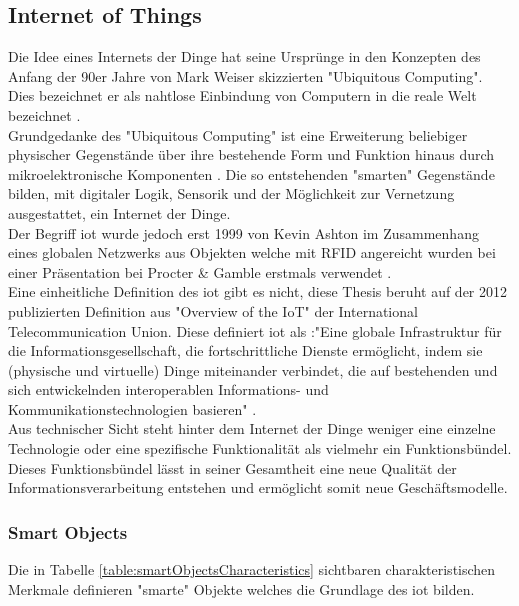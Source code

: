 \documentclass[a4paper, 12pt, twoside, headsepline=true]{scrartcl} %
\begin{document}
\subsection{Internet of Things}
Die Idee eines Internets der Dinge hat seine Ursprünge in den Konzepten des Anfang der 90er Jahre von Mark Weiser skizzierten "Ubiquitous Computing". Dies bezeichnet er als nahtlose Einbindung von Computern in die reale Welt bezeichnet \cite{ucweiser}. \\
Grundgedanke des "Ubiquitous Computing" ist eine Erweiterung beliebiger physischer Gegenstände über ihre bestehende Form und Funktion hinaus durch mikroelektronische Komponenten \cite{237456}. Die so entstehenden "smarten" Gegenstände bilden, mit digitaler Logik, Sensorik und der Möglichkeit zur Vernetzung ausgestattet, ein Internet der Dinge.\\
 Der Begriff \acl{iot} wurde jedoch erst 1999 von Kevin Ashton im Zusammenhang eines globalen Netzwerks aus Objekten welche mit RFID angereicht wurden bei einer Präsentation bei Procter \& Gamble erstmals verwendet \cite{rfidiot}. \\
 Eine einheitliche Definition des \ac{iot} gibt es nicht, diese Thesis beruht auf der 2012 publizierten Definition aus "Overview of the IoT" der International Telecommunication Union. Diese definiert \ac{iot} als :"Eine globale Infrastruktur für die Informationsgesellschaft, die fortschrittliche Dienste ermöglicht, indem sie (physische und virtuelle) Dinge miteinander verbindet, die auf bestehenden und sich entwickelnden interoperablen Informations- und Kommunikationstechnologien basieren" \cite{iotdefinition}. \\
Aus technischer Sicht steht hinter dem Internet der Dinge weniger eine einzelne Technologie oder eine spezifische Funktionalität als vielmehr ein Funktionsbündel. Dieses Funktionsbündel lässt in seiner Gesamtheit eine neue Qualität der Informationsverarbeitung entstehen und ermöglicht somit neue Geschäftsmodelle.

\subsubsection{Smart Objects}
 Die in Tabelle \ref{table:smartObjectsCharacteristics} sichtbaren charakteristischen Merkmale definieren "smarte" Objekte welches die Grundlage des \ac{iot} bilden.
\end{document}
